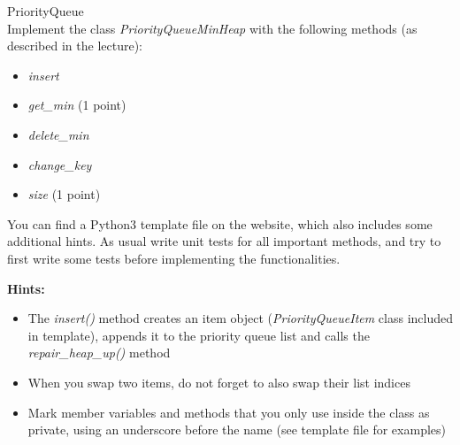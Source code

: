  PriorityQueue \\
Implement the class \textit{PriorityQueueMinHeap} with the following methods
(as described in the lecture):
\begin{itemize}
  \item\textit{insert} 
  \item\textit{get\_min} (1 point)
  \item\textit{delete\_min} 
  \item\textit{change\_key} 
  \item\textit{size} (1 point)
\end{itemize}

You can find a Python3 template file on the website, which also includes some additional hints. 
As usual write unit tests for all important methods, and try to first write some tests 
before implementing the functionalities.

\textbf{Hints:}
\begin{itemize}
\item The \emph{insert()} method creates an item object (\emph{PriorityQueueItem} class included in template), appends it to the priority queue list and calls the \emph{repair\_heap\_up()} method
\item When you swap two items, do not forget to also swap their list indices
\item Mark member variables and methods that you only use inside the class as private, using an underscore before the name (see template file for examples)
\end{itemize}
